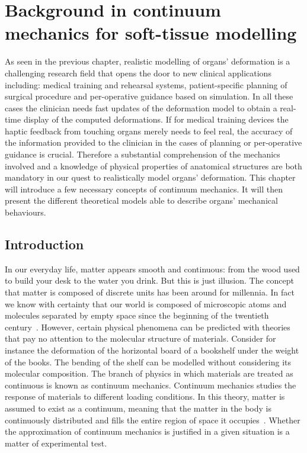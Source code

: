 \chapter{Background in continuum mechanics for soft-tissue modelling}
\label{chap:softtissue}
\begin{shortAbstract}
As seen in the previous chapter, realistic modelling of organs' deformation is a challenging research field that opens the door to new clinical applications including: medical training and rehearsal systems, patient-specific planning of surgical procedure and per-operative guidance based on simulation. In all these cases the clinician needs fast updates of the deformation model to obtain a real-time display of the computed deformations. If for medical training devices the haptic feedback from touching organs merely needs to feel real, the accuracy of the information provided to the clinician in the cases of planning or per-operative guidance is crucial. Therefore a substantial comprehension of the mechanics involved and a knowledge of physical properties of anatomical structures are both mandatory in our quest to realistically model organs' deformation. This chapter will introduce a few necessary concepts of continuum mechanics. It will then present the different theoretical models able to describe organs' mechanical behaviours. 
\end{shortAbstract}



\section{Introduction}
In our everyday life, matter appears smooth and continuous: from the wood used to build your desk to the water you drink. But this is just illusion. The concept that matter is composed of discrete units has been around for millennia. In fact we know with certainty that our world is composed of microscopic atoms and molecules separated by empty space since the beginning of the twentieth century~\citep{Lautrup05}. However, certain physical phenomena can be predicted with theories that pay no attention to the molecular structure of materials. Consider for instance the deformation of the horizontal board of a bookshelf under the weight of the books. The bending of the shelf can be modelled without considering its molecular composition. The branch of physics in which materials are treated as continuous is known as continuum mechanics. Continuum mechanics studies the response of materials to different loading conditions. In this theory, matter is assumed to exist as a continuum, meaning that the matter in the body is continuously distributed and fills the entire region of space it occupies~\citep{Lai96}. Whether the approximation of continuum mechanics is justified in a given situation is a matter of experimental test. 

